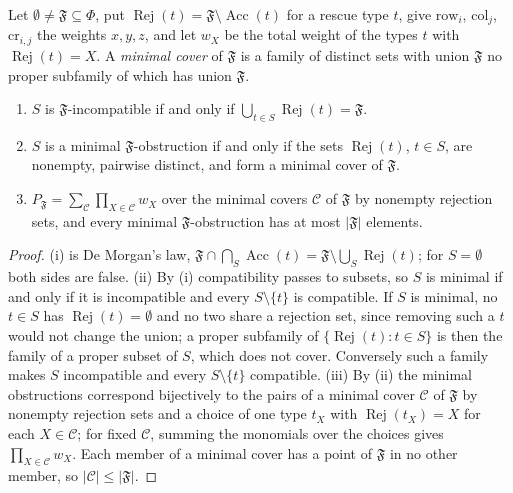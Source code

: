 \begin{lemma}\label{lem:obs:rejection-covers}
Let $\emptyset\ne\mathfrak F\subseteq\Phi$, put
$\operatorname{Rej}(t)=\mathfrak F\setminus\operatorname{Acc}(t)$ for a rescue
type $t$, give $\mathrm{row}_i$, $\mathrm{col}_j$, $\mathrm{cr}_{i,j}$ the weights
$x,y,z$, and let $w_X$ be the total weight of the types $t$ with
$\operatorname{Rej}(t)=X$. A \emph{minimal cover} of $\mathfrak F$ is a family of
distinct sets with union $\mathfrak F$ no proper subfamily of which has union
$\mathfrak F$.
\begin{enumerate}[label=(\roman*)]
\item $S$ is $\mathfrak F$-incompatible if and only if
 $\bigcup_{t\in S}\operatorname{Rej}(t)=\mathfrak F$.
\item $S$ is a minimal $\mathfrak F$-obstruction if and only if the sets
 $\operatorname{Rej}(t)$, $t\in S$, are nonempty, pairwise distinct, and form a
 minimal cover of $\mathfrak F$.
\item $P_{\mathfrak F}=\sum_{\mathcal C}\prod_{X\in\mathcal C}w_X$ over the minimal
 covers $\mathcal C$ of $\mathfrak F$ by nonempty rejection sets, and every
 minimal $\mathfrak F$-obstruction has at most $|\mathfrak F|$ elements.
\end{enumerate}
\end{lemma}

\begin{proof}
(i) is De Morgan's law,
$\mathfrak F\cap\bigcap_S\operatorname{Acc}(t)=\mathfrak F\setminus\bigcup_S
\operatorname{Rej}(t)$; for $S=\emptyset$ both sides are false. (ii) By (i)
compatibility passes to subsets, so $S$ is minimal if and only if it is
incompatible and every $S\setminus\{t\}$ is compatible. If $S$ is minimal, no
$t\in S$ has $\operatorname{Rej}(t)=\emptyset$ and no two share a rejection set,
since removing such a $t$ would not change the union; a proper subfamily of
$\{\operatorname{Rej}(t):t\in S\}$ is then the family of a proper subset of $S$,
which does not cover. Conversely such a family makes $S$ incompatible and every
$S\setminus\{t\}$ compatible. (iii) By (ii) the minimal obstructions correspond
bijectively to the pairs of a minimal cover $\mathcal C$ of $\mathfrak F$ by
nonempty rejection sets and a choice of one type $t_X$ with
$\operatorname{Rej}(t_X)=X$ for each $X\in\mathcal C$; for fixed $\mathcal C$,
summing the monomials over the choices gives $\prod_{X\in\mathcal C}w_X$. Each member of a minimal cover
has a point of $\mathfrak F$ in no other member, so $|\mathcal C|\le|\mathfrak F|$.
\end{proof}

